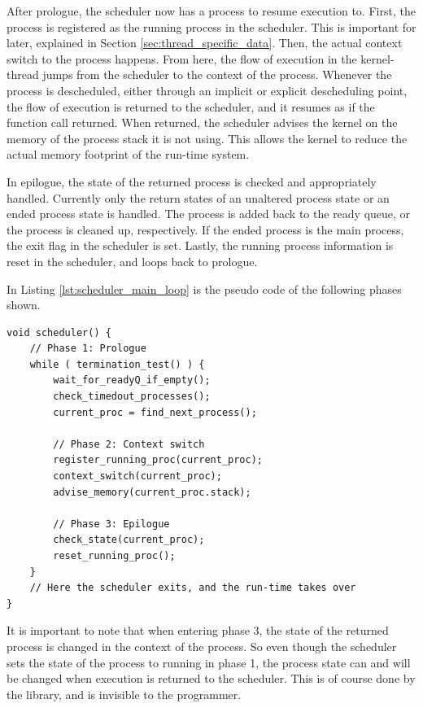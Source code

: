 After prologue, the scheduler now has a process to resume execution to. First, the process is registered as the running process in the scheduler. This is important for later, explained in Section \ref{sec:thread_specific_data}. Then, the actual context switch to the process happens. From here, the flow of execution in the kernel\hyp{}thread jumps from the scheduler to the context of the process. Whenever the process is descheduled, either through an implicit or explicit descheduling point, the flow of execution is returned to the scheduler, and it resumes as if the function call returned. When returned, the scheduler advises the kernel on the memory of the process stack it is not using. This allows the kernel to reduce the actual memory footprint of the run\hyp{}time system.

In epilogue, the state of the returned process is checked and appropriately handled. Currently only the return states of an unaltered process state or an ended process state is handled. The process is added back to the ready queue, or the process is cleaned up, respectively. If the ended process is the main process, the exit flag in the scheduler is set. Lastly, the running process information is reset in the scheduler, and loops back to prologue.

In Listing \ref{lst:scheduler_main_loop}  is the pseudo code of the following phases shown.
\begin{lstlisting}[style=CustomC,caption={Pseudo code for scheduler main loop},label={lst:scheduler_main_loop}]
void scheduler() {
    // Phase 1: Prologue
    while ( termination_test() ) {
        wait_for_readyQ_if_empty();
        check_timedout_processes();
        current_proc = find_next_process();
        
        // Phase 2: Context switch
        register_running_proc(current_proc);
        context_switch(current_proc);
        advise_memory(current_proc.stack);
        
        // Phase 3: Epilogue
        check_state(current_proc);
        reset_running_proc();      
    }
    // Here the scheduler exits, and the run-time takes over
}
\end{lstlisting}

It is important to note that when entering phase 3, the state of the returned process is chan\-ged in the context of the process. So even though the scheduler sets the state of the process to running in phase 1, the process state can and will be changed when execution is returned to the scheduler. This is of course done by the library, and is invisible to the programmer.


